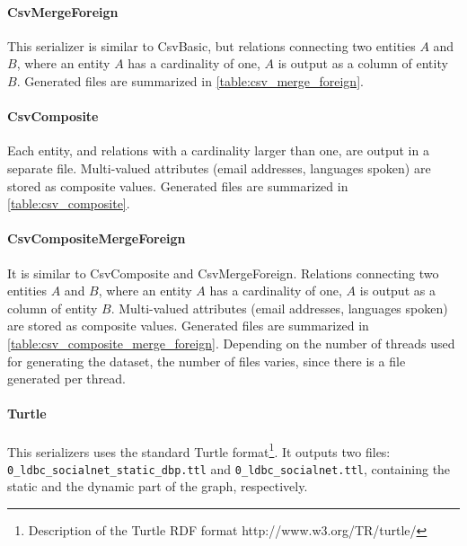 

\paragraph{CsvMergeForeign}

This serializer is similar to CsvBasic, but relations connecting two entities $A$ and $B$, where an entity $A$ has a cardinality of one, $A$ is output as a column of entity $B$.
Generated files are summarized in \autoref{table:csv_merge_foreign}.



\paragraph{CsvComposite}

Each entity, and relations with a cardinality larger than one, are output in a separate file.
Multi-valued attributes (email addresses, languages spoken) are stored as composite values.
Generated files are summarized in \autoref{table:csv_composite}.



\paragraph{CsvCompositeMergeForeign}

It is similar to CsvComposite and CsvMergeForeign.
Relations connecting two entities $A$ and $B$, where an entity $A$ has a cardinality of one, $A$ is output as a column of entity $B$.
Multi-valued attributes (email addresses, languages spoken) are stored as composite values.
Generated files are summarized in \autoref{table:csv_composite_merge_foreign}.
Depending on the number of threads used for generating the dataset, the number of files varies, since there is a file generated per thread.



\paragraph{Turtle}

This serializers uses the standard Turtle format\footnote{Description of
the Turtle RDF format http://www.w3.org/TR/turtle/}. It outputs
two files: \texttt{0\_ldbc\_socialnet\_static\_dbp.ttl} and \texttt{0\_ldbc\_socialnet.ttl}, containing the static and the dynamic part of the graph, respectively.

